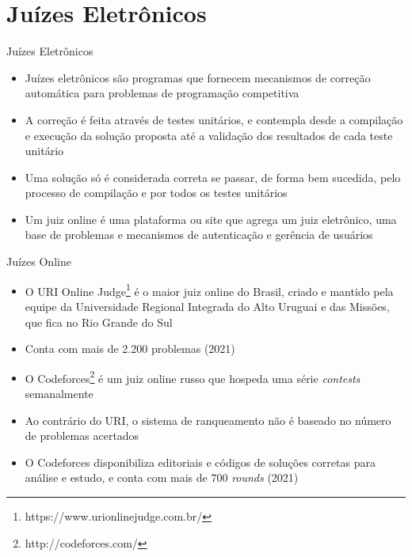 \section{Juízes Eletrônicos}

\begin{frame}[fragile]{Juízes Eletrônicos}

    \begin{itemize}
        \item Juízes eletrônicos são programas que fornecem mecanismos de correção automática para 
        problemas de programação competitiva
        \item A correção é feita através de testes unitários, e contempla desde a compilação e 
        execução da solução proposta até a validação dos resultados de cada teste unitário
        \item Uma solução só é considerada correta se passar, de  forma  bem  sucedida,
        pelo  processo de  compilação  e por todos os testes unitários
        \item Um juiz online é uma plataforma ou site que agrega um juiz eletrônico, uma base de
        problemas e mecanismos de autenticação e gerência de usuários
    \end{itemize}

\end{frame}

\begin{frame}[fragile]{Juízes Online}

    \begin{itemize}
        \item O URI Online Judge\footnote{https://www.urionlinejudge.com.br/} 
        é o maior juiz online do Brasil, criado e mantido pela equipe
        da Universidade Regional Integrada do Alto Uruguai e das Missões, que fica no 
        Rio Grande do Sul
        \item Conta com mais de 2.200 problemas (2021)
        \item O Codeforces\footnote{http://codeforces.com/} é um juiz online russo que 
        hospeda uma série \textit{contests} semanalmente
        \item Ao contrário do URI, o sistema de ranqueamento não é baseado no número de problemas
        acertados
        \item O Codeforces disponibiliza editoriais e códigos de soluções corretas para análise e 
        estudo, e conta com mais de 700 \textit{rounds} (2021)
   \end{itemize}

\end{frame}

